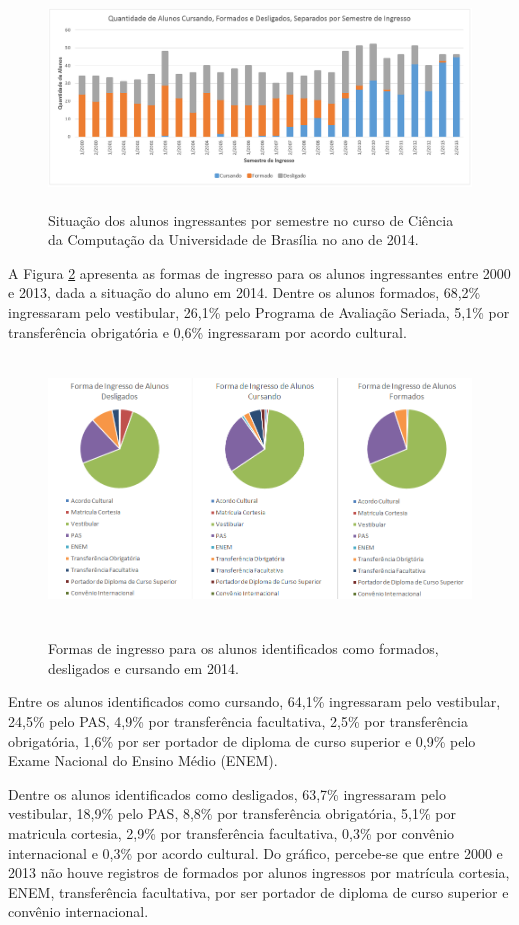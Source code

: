 \begin{figure}[!h]
	\centering
	{\includegraphics[width=16cm, height=5cm]{images/grafico2}}
	\caption {Situação dos alunos ingressantes por semestre no curso de Ciência da Computação da Universidade de Brasília no ano de 2014.}
	\label{grafico2}
\end{figure}


A Figura \ref{grafico10} apresenta as formas de ingresso para os alunos ingressantes entre 2000 e 2013, dada a situação do aluno em 2014. Dentre os alunos formados, 68,2\% ingressaram pelo vestibular, 26,1\% pelo Programa de Avaliação Seriada, 5,1\% por transferência obrigatória  e 0,6\% ingressaram por acordo cultural.

\begin{figure}[!htb]
	\centering
	{\includegraphics[width=14cm, height=7cm]{images/grafico10}}
	\caption {Formas de ingresso para os alunos identificados como formados, desligados e cursando em 2014.}
	\label{grafico10}
\end{figure}

Entre os alunos identificados como cursando, 64,1\% ingressaram pelo vestibular, 24,5\% pelo PAS, 4,9\% por transferência facultativa, 2,5\% por transferência obrigatória, 1,6\% por ser portador de diploma de curso superior e 0,9\% pelo Exame Nacional do Ensino Médio (ENEM).

Dentre os alunos identificados como desligados, 63,7\% ingressaram pelo vestibular, 18,9\% pelo PAS, 8,8\% por transferência obrigatória, 5,1\% por matricula cortesia, 2,9\% por transferência facultativa, 0,3\% por convênio internacional e 0,3\% por acordo cultural. Do gráfico, percebe-se que entre 2000 e 2013 não houve registros de formados por alunos ingressos por matrícula cortesia, ENEM, transferência facultativa, por ser portador de diploma de curso superior e convênio internacional.
 
